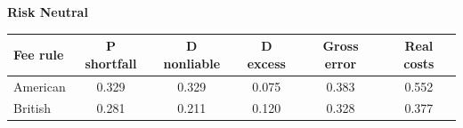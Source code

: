 \documentclass[10pt,border=5pt,varwidth=17cm]{standalone}
\begin{document}
\begingroup
\small
\setlength{\tabcolsep}{5pt}
\renewcommand{\arraystretch}{1.20}
\noindent\textbf{Risk Neutral}\par\smallskip
\noindent\begin{tabularx}{\linewidth}{@{}>{\raggedright\arraybackslash}Xccccc@{}}
\toprule
\textbf{Fee rule} & \textbf{P shortfall} & \textbf{D nonliable} & \textbf{D excess} & \textbf{Gross error} & \textbf{Real costs} \\
\midrule
American & 0.329 & 0.329 & 0.075 & 0.383 & 0.552 \\
British & 0.281 & 0.211 & 0.120 & 0.328 & 0.377 \\
\bottomrule\end{tabularx}\par\medskip
\endgroup
\end{document}
